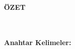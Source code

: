 ~\pagebreak


\begin{center}
	{\fontsize{16}{16}\bfseries ÖZET}
\end{center}
\begin{center}
	\vspace{0.5cm}
	{\fontsize{14}{14}\selectfont\TurkishThesisTitle}
\end{center}
\OneAndHalfSpacing
~\indent\OzetText
~\\~\\
\textbf{Anahtar Kelimeler: }\OzetKeywords

\vfill
~\pagebreak
